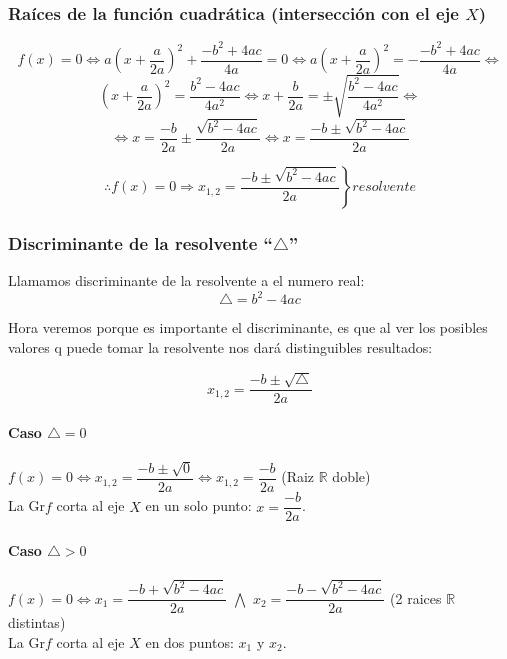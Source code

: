 \subsubsection{Raíces de la función cuadrática (intersección con el eje $X$)}

$$f(x)=0 \Leftrightarrow a\left(x+\dfrac{a}{2a}\right)^{2}+\dfrac{-b^{2}+4ac}{4a}=0 \Leftrightarrow
a\left(x+\dfrac{a}{2a}\right)^{2}=-\dfrac{-b^{2}+4ac}{4a} \Leftrightarrow $$ $$
 \left(x+\dfrac{a}{2a}\right)^{2}=\dfrac{b^{2}-4ac}{4a^{2}} \Leftrightarrow x+\dfrac{b}{2a}=\pm\sqrt{\dfrac{b^{2}-4ac}{4a^{2}}} \Leftrightarrow $$ $$
 \Leftrightarrow x =\dfrac{-b}{2a}\pm\dfrac{\sqrt{b^{2}-4ac}}{2a}\Leftrightarrow  x=\dfrac{-b\pm\sqrt{b^{2}-4ac}}{2a}$$
 
$$ \therefore f(x)=0 \Rightarrow x_{1,2}=\left. \dfrac{-b\pm\sqrt{b^{2}-4ac}}{2a}\right\} resolvente$$
\subsubsection{Discriminante de la resolvente ``$\bigtriangleup$''}

Llamamos discriminante de la resolvente a el numero real:
$$\bigtriangleup = b^2 -4ac$$

Hora veremos porque es importante el discriminante, es que al ver los posibles valores q puede tomar la resolvente nos dará distinguibles resultados:

$$x_{1,2}= \dfrac{-b\pm\sqrt{ \bigtriangleup }}{2a}$$

\paragraph{Caso $\bigtriangleup = 0$}
\begin{center}
$f(x)=0 \Leftrightarrow x_{1,2}= \dfrac{-b\pm\sqrt{0}}{2a} 
\Leftrightarrow x_{1,2}= \dfrac{-b}{2a} $ \qquad (Raiz $\mathbb{R}$ doble)\\

La Gr$f$ corta al eje $X$ en un solo punto: $x=\dfrac{-b}{2a}$.
\end{center}

\paragraph{Caso  $\bigtriangleup > 0$}
\begin{center}
$f(x)=0 \Leftrightarrow x_1= \dfrac{-b + \sqrt{b^{2}-4ac}}{2a} 
$ \quad$ \bigwedge $ \quad$ x_2=\dfrac{-b-\sqrt{b^{2}-4ac}}{2a}
$ \qquad (2 raices $\mathbb{R}$ distintas)\\

La Gr$f$ corta al eje $X$ en dos puntos: $x_1$ y $x_2$.
\end{center}

